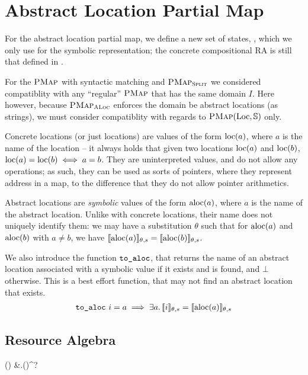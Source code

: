 \section{Abstract Location Partial Map}

For the abstract location partial map, we define a new set of states, \ALocPMap, which we only use for the symbolic representation; the concrete compositional RA is still that defined in \PMap. 

For the $\textsc{PMap}$ with syntactic matching and $\textsc{PMap}_{\textsc{Split}}$ we considered compatiblity with any ``regular'' $\textsc{PMap}$ that has the same domain $I$. Here however, because $\textsc{PMap}_{\textsc{ALoc}}$ enforces the domain be abstract locations (as strings), we must consider compatiblity with regards to $\textsc{PMap}(\text{Loc}, \mathbb S)$ only.

Concrete locations (or just locations) are values of the form $\text{loc}(a)$, where $a$ is the name of the location -- it always holds that given two locations $\text{loc}(a)$ and $\text{loc}(b)$, $\text{loc}(a)=\text{loc}(b) \iff a=b$. They are uninterpreted values, and do not allow any operations; as such, they can be used as sorts of pointers, where they represent address in a map, to the difference that they do not allow pointer arithmetics.

Abstract locations are \emph{symbolic} values of the form $\text{aloc}(a)$, where $a$ is the name of the abstract location. Unlike with concrete locations, their name does not uniquely identify them: we may have a substitution $\theta$ such that for $\text{aloc}(a)$ and $\text{aloc}(b)$ with $a\neq b$, we have $\llbracket\text{aloc}(a)\rrbracket_{\theta,s} = \llbracket\text{aloc}(b)\rrbracket_{\theta,s}$.

We also introduce the function $\texttt{to\_aloc}$, that returns the name of an abstract location associated with a symbolic value if it exists and is found, and $\bot$ otherwise. This is a best effort function, that may not find an abstract location that exists. \begin{align*}
	\texttt{to\_aloc}~i = a \implies \exists a\ldotp \llbracket i\rrbracket_{\theta,s}=\llbracket\text{aloc}(a)\rrbracket_{\theta,s}
\end{align*}

\subsection{Resource Algebra}

\begin{breakalign*}
	\ALocPMap(\mmdl) & \Str \finmap \mmdl.\Sigma \times \pset(\LVal)^?
\end{breakalign*}

